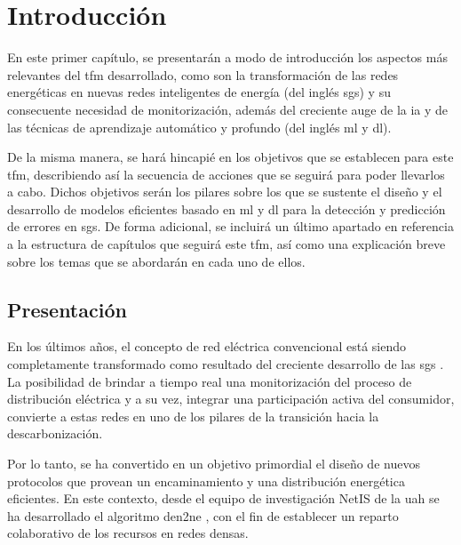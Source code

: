 
\chapter{Introducción}
\label{ch:intro}

En este primer capítulo, se presentarán a modo de introducción los aspectos más relevantes del \acrfull{tfm} desarrollado, como son la transformación de las redes energéticas en nuevas redes inteligentes de energía (del inglés \gls{sgs}) y su consecuente necesidad de monitorización, además del creciente auge de la \gls{ia} y de las técnicas de aprendizaje automático y profundo (del inglés \acrfull{ml} y \acrfull{dl}).

\vspace{3mm}

De la misma manera, se hará hincapié en los objetivos que se establecen para este \gls{tfm}, describiendo así la secuencia de acciones que se seguirá para poder llevarlos a cabo. Dichos objetivos serán los pilares sobre los que se sustente el diseño y el desarrollo de modelos eficientes basado en \gls{ml} y \gls{dl} para la detección y predicción de errores en \gls{sg}s. De forma adicional, se incluirá un último apartado en referencia a la estructura de capítulos que seguirá este \gls{tfm}, así como una explicación breve sobre los temas que se abordarán en cada uno de ellos.


\section{Presentación}
\label{sec:presentacion}

En los últimos años, el concepto de red eléctrica convencional está siendo completamente transformado como resultado del creciente desarrollo de las \gls{sg}s \cite{repsol} \cite{impact}. La posibilidad de brindar a tiempo real una monitorización del proceso de distribución eléctrica y a su vez, integrar una participación activa del consumidor, convierte a estas redes en uno de los pilares de la transición hacia la descarbonización. 

\vspace{3mm}

Por lo tanto, se ha convertido en un objetivo primordial el diseño de nuevos protocolos que provean un encaminamiento y una distribución energética eficientes. En este contexto, desde el equipo de investigación NetIS de la \gls{uah} se ha desarrollado el algoritmo \gls{den2ne} \cite{den2ne}, con el fin de establecer un reparto colaborativo de los recursos en redes densas.  

